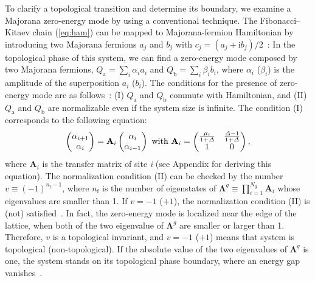 \documentclass[%
superscriptaddress,
preprint,
amsmath,amssymb,
]{revtex4-1}
\newcommand{\mrm}{\mathrm}
\newcommand{\mbf}{\mathbf}
\newcommand{\im}{\mrm{i}}
\begin{document}
To clarify a topological transition and determine its boundary, we examine a Majorana zero-energy mode by using a conventional technique.
The Fibonacci--Kitaev chain (\ref{eq:ham}) can be mapped to Majorana-fermion Hamiltonian by introducing two Majorana fermions $a_j$ and $b_j$ with $c_j=(a_j+\im b_j)/2$~\cite{Kitaev01}:
In the topological phase of this system, we can find a zero-energy mode composed by two Majorana fermions, $Q_{\mrm{a}}=\sum_i\alpha_i a_i$ and $Q_{\mrm{b}}=\sum_i\beta_i b_i$, where $\alpha_i$ ($\beta_i$) is the amplitude of the superposition $a_i$ ($b_i$). 
The conditions for the presence of zero-energy mode are as follows~\cite{DeGottardi13,DeGottardi131,DeGottardi11}: (I) $Q_{\mrm{a}}$ and $Q_{\mrm{b}}$ commute with Hamiltonian, and (II) $Q_{\mrm{a}}$ and $Q_{\mrm{b}}$ are normalizable even if the system size is infinite. 
The condition (I) corresponds to the following equation: 
\begin{equation}
\left(\begin{matrix}
\alpha_{i+1}\\\alpha_i
\end{matrix}\right)=\mbf{A}_i
\left(\begin{matrix}
\alpha_{i}\\\alpha_{i-1}
\end{matrix}\right)
\text{ with }
\mbf{A}_i=\left(
\begin{matrix}
\frac{\mu_i}{1+{\it\Delta}} & \frac{{\it\Delta}-1}{1+{\it\Delta}} \\ 1 & 0
\end{matrix}
\right),
\label{eq:tm}
\end{equation}
where $\mbf{A}_i$ is the transfer matrix of site \textit{i} (see Appendix for deriving this equation).
The normalization condition (II) can be checked by the number $v\equiv (-1)^{n_{\mrm{f}}-1}$, where $n_{\mrm{f}}$ is the number of eigenstates of $\mbf{\Lambda}^g\equiv\prod_{i=1}^{N_g}\mbf{A}_i$ whose eigenvalues are smaller than 1.
If $v=-1$ ($+1$), the normalization condition (II) is (not) satisfied~\cite{note}.
In fact, the zero-energy mode is localized near the edge of the lattice, when both of the two eigenvalue of $\mbf{\Lambda}^g$ are smaller or larger than 1.
Therefore, $v$ is a topological invariant, and $v=-1$ ($+1$) means that system is topological (non-topological). 
If the absolute value of the two eigenvalues of $\mbf{\Lambda}^g$ is one, the system stands on its topological phase boundary, where an energy gap vanishes~\cite{DeGottardi13,DeGottardi11}.
\end{document}
